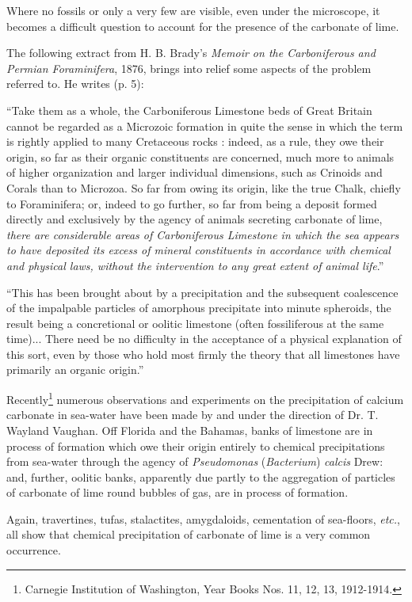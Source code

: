 \documentclass[a4paper, 12pt, oneside]{article}
\begin{document}
Where no fossils or only a very few are visible, even under the microscope, it becomes a difficult question to account for the presence of the carbonate of lime.

The following extract from H. B. Brady's \emph{Memoir on the Carboniferous and Permian Foraminifera}, 1876, brings into relief some aspects of the problem referred to. He writes (p. 5):

``Take them as a whole, the Carboniferous Limestone beds of Great Britain cannot be regarded as a Microzoic formation in quite the sense in which the term is rightly applied to many Cretaceous rocks : indeed, as a rule, they owe their origin, so far as their organic constituents are concerned, much more to animals of higher organization and larger individual dimensions, such as Crinoids and Corals than to Microzoa. So far from owing its origin, like the true Chalk, chiefly to Foraminifera; or, indeed to go further, so far from being a deposit formed directly and exclusively by the agency of animals secreting carbonate of lime, \emph{there are considerable areas of Carboniferous Limestone in which the sea appears to have deposited its excess of mineral constituents in accordance with chemical and physical laws, without the intervention to any great extent of animal life}.''

``This has been brought about by a precipitation and the subsequent coalescence of the impalpable particles of amorphous precipitate into minute spheroids, the result being a concretional or oolitic limestone (often fossiliferous at the same time)... There need be no difficulty in the acceptance of a physical explanation of this sort, even by those who hold most firmly the theory that all limestones have primarily an organic origin.''

Recently\footnote{Carnegie Institution of Washington, Year Books Nos. 11, 12, 13, 1912-1914.} numerous observations and experiments on the precipitation of calcium carbonate in sea-water have been made by and under the direction of Dr. T. Wayland Vaughan. Off Florida and the Bahamas, banks of limestone are in process of formation which owe their origin entirely to chemical precipitations from sea-water through the agency of \emph{Pseudomonas} (\emph{Bacterium}) \emph{calcis} Drew: and, further, oolitic banks, apparently due partly to the aggregation of particles of carbonate of lime round bubbles of gas, are in process of formation.

Again, travertines, tufas, stalactites, amygdaloids, cementation of sea-floors, \emph{etc.}, all show that chemical precipitation of carbonate of lime is a very common occurrence.
\end{document}

